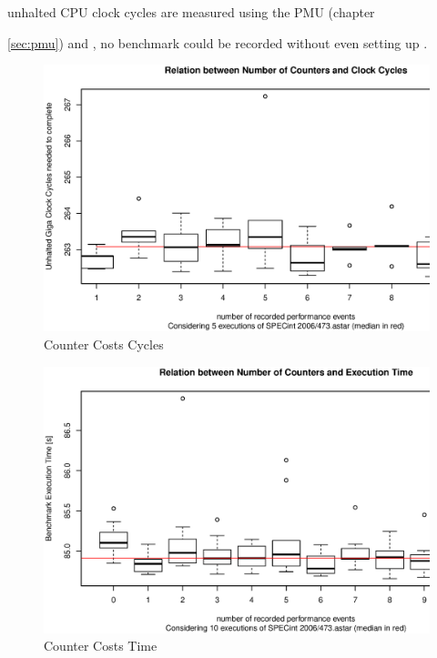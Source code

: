 unhalted CPU clock cycles are measured using the PMU (chapter {\ref{sec:pmu})
and \JWTlibpfm{}, no benchmark could be recorded without even setting up
\JWTlibpfm{}.

\begin{figure}
  \centering
    \includegraphics[width=\textwidth]{fig/ctr-csts-cycles.eps}
  \caption{Counter Costs Cycles}
  \label{fig:ctr-costs-cycles}
\end{figure}

\begin{figure}
  \centering
    \includegraphics[width=\textwidth]{fig/ctr-csts-time.eps}
  \caption{Counter Costs Time}
  \label{fig:ctr-costs-time}
\end{figure}

}
